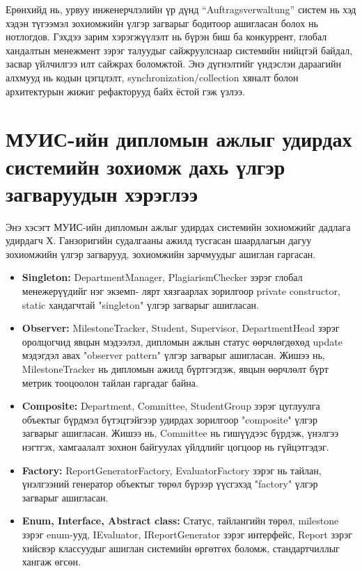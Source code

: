 Ерөнхийд нь, урвуу инженерчлэлийн үр дүнд “Auftragsverwaltung” систем нь хэд хэдэн түгээмэл зохиомжийн үлгэр загварыг бодитоор ашигласан болох нь нотлогдов. Гэхдээ зарим хэрэгжүүлэлт нь бүрэн биш ба конкуррент, глобал хандалтын менежмент зэрэг талуудыг сайжруулснаар системийн нийцтэй байдал, засвар үйлчилгээ илт сайжрах боломжтой. Энэ дүгнэлтийг үндэслэн дараагийн алхмууд нь кодын цэгцлэлт, synchronization/collection хяналт болон архитектурын жижиг рефакторууд байх ёстой гэж үзлээ.

\section{МУИС-ийн дипломын ажлыг удирдах системийн зохиомж дахь үлгэр загваруудын хэрэглээ}
Энэ хэсэгт МУИС-ийн дипломын ажлыг удирдах системийн зохиомжийг дадлага удирдагч Х. Ганзоригийн судалгааны ажилд тусгасан шаардлагын дагуу  зохиомжийн үлгэр загварууд, зохиомжийн зарчмуудыг ашиглан гаргасан.
\begin{itemize}
	\item \textbf{Singleton:} DepartmentManager, PlagiarismChecker зэрэг глобал менежерүүдийг нэг экземп- лярт хязгаарлах зорилгоор private constructor, static хандагчтай "singleton" үлгэр загварыг ашигласан.
	\item \textbf{Observer:} MilestoneTracker, Student, Supervisor, DepartmentHead зэрэг оролцогчид явцын мэдээлэл, дипломын ажлын статус өөрчлөгдөхөд update мэдэгдэл авах "observer pattern" үлгэр загварыг ашигласан. Жишээ нь, MilestoneTracker нь дипломын ажилд бүртгэгдэж, явцын өөрчлөлт бүрт метрик тооцоолон тайлан гаргадаг байна.
	\item \textbf{Composite:} Department, Committee, StudentGroup зэрэг цуглуулга объектыг бүрдмэл бүтэцтэйгээр удирдах зорилгоор "composite" үлгэр загварыг ашигласан. Жишээ нь, Committee нь гишүүдээс бүрдэж, үнэлгээ нэгтгэх, хамгаалалт зохион байгуулах үйлдлийг цогцоор нь гүйцэтгэдэг.
	\item \textbf{Factory:} ReportGeneratorFactory, EvaluatorFactory зэрэг нь тайлан, үнэлгээний генератор объектыг төрөл бүрээр үүсгэхэд "factory" үлгэр загварыг ашигласан.
	\item \textbf{Enum, Interface, Abstract class:} Статус, тайлангийн төрөл, milestone зэрэг enum-ууд, IEvaluator, IReportGenerator зэрэг интерфейс, Report зэрэг хийсвэр классуудыг ашиглан системийн өргөтгөх боломж, стандартчиллыг хангаж өгсөн.
\end{itemize}

